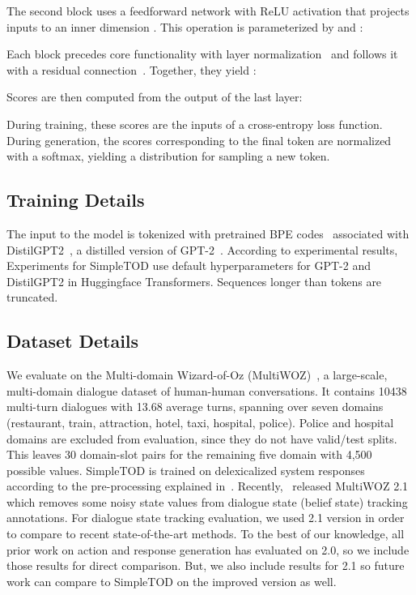 \documentclass{article}
\begin{document}
The second block uses a feedforward network with ReLU activation that projects inputs to an inner dimension . 
This operation is parameterized by  and :

Each block precedes core functionality with layer normalization~\citep{Ba2016LayerN, child2019sparse} and follows it with a residual connection~\citep{he2016deep}. Together, they yield :


Scores are then computed from the output of the last layer:

During training, these scores are the inputs of a cross-entropy loss function.
During generation, the scores corresponding to the final token are normalized with a softmax, yielding a distribution for sampling a new token.

\subsection{Training Details}
\label{ssec:train-detail}
The input to the model is tokenized with pretrained BPE codes~\citep{sennrich-etal-2016-neural} associated with DistilGPT2~\citep{sanh2019distilbert}, a distilled version of GPT-2~\citep{radford2019language}.
According to experimental results, 
Experiments for SimpleTOD use default hyperparameters for GPT-2 and DistilGPT2 in Huggingface Transformers\citep{wolf2019transformers}.
Sequences longer than  tokens are truncated.

\subsection{Dataset Details}
We evaluate on the Multi-domain Wizard-of-Oz (MultiWOZ)~\citep{budzianowski2018towards}, 
a large-scale, multi-domain dialogue dataset of human-human conversations. 
It contains 10438 multi-turn dialogues with 13.68 average turns, 
spanning over seven domains (restaurant, train, attraction, hotel, taxi, hospital, police). 
Police and hospital domains are excluded from evaluation, 
since they do not have valid/test splits.
This leaves 30 domain-slot pairs for the remaining five domain with 4,500 possible values.
SimpleTOD is trained on delexicalized system responses according to the pre-processing explained in~\cite{budzianowski2018towards}. 
Recently,~\cite{eric2019multiwoz} released MultiWOZ 2.1 which removes some noisy state values from dialogue state (belief state) tracking annotations.
For dialogue state tracking evaluation, 
we used 2.1 version in order to compare to recent state-of-the-art methods. 
To the best of our knowledge, 
all prior work on action and response generation has evaluated on 2.0, so we include those results for direct comparison.
But, we also include results for 2.1 so future work can compare to SimpleTOD on the improved version as well.
\end{document}
